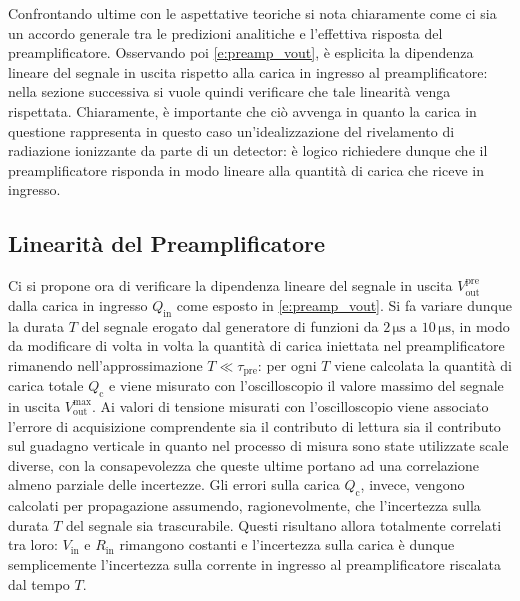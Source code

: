 \documentclass[a4paper,11pt]{article} %
\begin{document}
Confrontando ultime con le aspettative teoriche si nota chiaramente come ci sia un accordo generale tra le predizioni
analitiche e l'effettiva risposta del preamplificatore. Osservando poi \autoref{e:preamp_vout}, è esplicita la
dipendenza lineare del segnale in uscita rispetto alla carica in ingresso al preamplificatore: nella sezione successiva
si vuole quindi verificare che tale linearità venga rispettata. Chiaramente, è importante che ciò avvenga in quanto la
carica in questione rappresenta in questo caso un'idealizzazione del rivelamento di radiazione ionizzante da parte di un
detector: è logico richiedere dunque che il preamplificatore risponda in modo lineare alla quantità di carica che riceve
in ingresso.



\subsection{Linearità del Preamplificatore}\label{s:preamp_linearity}

Ci si propone ora di verificare la dipendenza lineare del segnale in uscita $V^{\text{pre}}_{\text{out}}$ dalla carica
in ingresso $Q_{\text{in}}$ come esposto in \autoref{e:preamp_vout}. Si fa variare dunque la durata $T$ del segnale
erogato dal generatore di funzioni da $2\,\si{\us}$ a $10\,\si{\us}$, in modo da modificare di volta in volta la
quantità di carica iniettata nel preamplificatore rimanendo nell'approssimazione $T\ll\tau_{\text{pre}}$: per ogni $T$
viene calcolata la quantità di carica totale $Q_{\text{c}}$ e viene misurato con l'oscilloscopio il valore massimo del
segnale in uscita $V^{\text{max}}_{\text{out}}$. Ai valori di tensione misurati con l'oscilloscopio viene associato
l'errore di acquisizione comprendente sia il contributo di lettura sia il contributo sul guadagno verticale in quanto
nel processo di misura sono state utilizzate scale diverse, con la consapevolezza che queste ultime portano ad una
correlazione almeno parziale delle incertezze. Gli errori sulla carica $Q_{\text{c}}$, invece, vengono calcolati per
propagazione assumendo, ragionevolmente, che l'incertezza sulla durata $T$ del segnale sia trascurabile. Questi
risultano allora totalmente correlati tra loro: $V_{\text{in}}$ e $R_{\text{in}}$ rimangono costanti e l'incertezza
sulla carica è dunque semplicemente l'incertezza sulla corrente in ingresso al preamplificatore riscalata dal tempo $T$.
\end{document}
